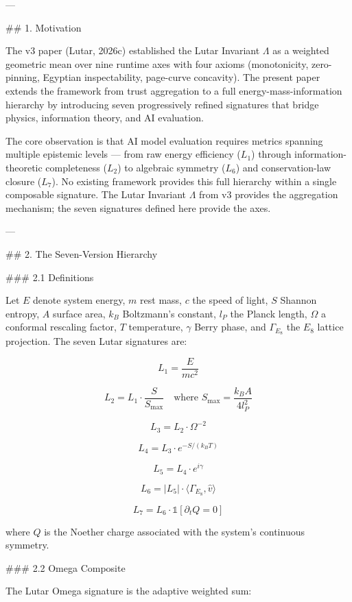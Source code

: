 ---

## 1. Motivation

The v3 paper (Lutar, 2026c) established the Lutar Invariant \( \Lambda \) as a weighted geometric mean over nine runtime axes with four axioms (monotonicity, zero-pinning, Egyptian inspectability, page-curve concavity). The present paper extends the framework from trust aggregation to a full energy-mass-information hierarchy by introducing seven progressively refined signatures that bridge physics, information theory, and AI evaluation.

The core observation is that AI model evaluation requires metrics spanning multiple epistemic levels --- from raw energy efficiency (\( L_1 \)) through information-theoretic completeness (\( L_2 \)) to algebraic symmetry (\( L_6 \)) and conservation-law closure (\( L_7 \)). No existing framework provides this full hierarchy within a single composable signature. The Lutar Invariant \( \Lambda \) from v3 provides the aggregation mechanism; the seven signatures defined here provide the axes.

---

## 2. The Seven-Version Hierarchy

### 2.1 Definitions

Let \( E \) denote system energy, \( m \) rest mass, \( c \) the speed of light, \( S \) Shannon entropy, \( A \) surface area, \( k_B \) Boltzmann's constant, \( l_P \) the Planck length, \( \Omega \) a conformal rescaling factor, \( T \) temperature, \( \gamma \) Berry phase, and \( \Gamma_{E_8} \) the \( E_8 \) lattice projection. The seven Lutar signatures are:

\[
L_1 = \frac{E}{mc^2}
\]

\[
L_2 = L_1 \cdot \frac{S}{S_{\max}} \quad \text{where } S_{\max} = \frac{k_B A}{4 l_P^2}
\]

\[
L_3 = L_2 \cdot \Omega^{-2}
\]

\[
L_4 = L_3 \cdot e^{-S/(k_B T)}
\]

\[
L_5 = L_4 \cdot e^{i\gamma}
\]

\[
L_6 = |L_5| \cdot \langle \Gamma_{E_8}, \hat{v} \rangle
\]

\[
L_7 = L_6 \cdot \mathbb{1}[\partial_t Q = 0]
\]

where \( Q \) is the Noether charge associated with the system's continuous symmetry.

### 2.2 Omega Composite

The Lutar Omega signature is the adaptive weighted sum:

